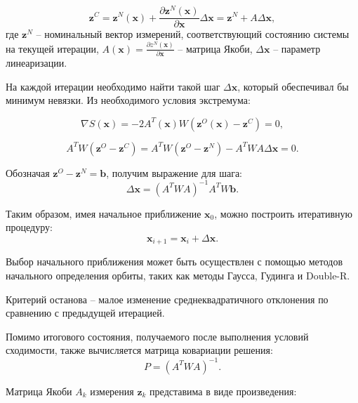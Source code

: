\begin{equation*}
    \mathbf{z}^C = \mathbf{z}^N (\mathbf{x}) +  
    \frac{\partial \mathbf{z}^N (\mathbf{x})}{\partial \mathbf{x}} \Delta \mathbf{x} = 
    \mathbf{z}^N + A \Delta \mathbf{x},
\end{equation*}
где $\mathbf{z}^N$ -- номинальный вектор измерений, соответствующий состоянию системы на текущей итерации,
 $A (\mathbf{x}) = \frac{\partial z^N (\mathbf{x})}{\partial \mathbf{x}}$ -- матрица Якоби,
 $\Delta \mathbf{x}$ -- параметр линеаризации.

На каждой итерации необходимо найти такой шаг $\Delta \mathbf{x}$, который обеспечивал бы
минимум невязки. Из необходимого условия экстремума:

\begin{equation*}
    \nabla S(\mathbf{x}) = - 2 A^T (\mathbf{x}) W (\mathbf{z}^O (\mathbf{x}) - \mathbf{z}^C) = 0,
\end{equation*}

\begin{equation*}
    A^T W (\mathbf{z}^O - \mathbf{z}^C) 
    = A^T W (\mathbf{z}^O - \mathbf{z}^N) - A^T W A \Delta \mathbf{x} = 0.
\end{equation*}

Обозначая $\mathbf{z}^O - \mathbf{z}^N = \mathbf{b}$, получим выражение для шага:
\begin{equation}
    \Delta \mathbf{x} = (A^T W A)^{-1} A^T W \mathbf{b}.
\end{equation}

Таким образом, имея начальное приближение $\mathbf{x}_{0}$, можно построить итеративную процедуру:
\begin{equation}
    \mathbf{x}_{i + 1} = \mathbf{x}_{i} + \Delta \mathbf{x}.
\end{equation}

Выбор начального приближения может быть осуществлен с помощью методов начального
определения орбиты, таких как методы Гаусса, Гудинга и Double-R.

Критерий останова -- малое изменение среднеквадратичного отклонения по сравнению с предыдущей итерацией.

Помимо итогового состояния, получаемого после выполнения условий сходимости, 
также вычисляется матрица ковариации решения:
\begin{equation}
    P = (A^T W A)^{-1}.
\end{equation}

Матрица Якоби $A_k$ измерения $\mathbf{z}_k$ представима в виде произведения:

